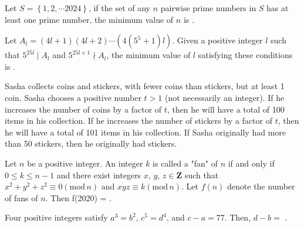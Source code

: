 \begin{problem}\label{Alg1}
Let $S=\left\{ 1,2,\cdots 2024 \right\}$, if the set of any $n$ pairwise prime numbers in $S$ has at least one prime number, the minimum value of $n$ is \underline{\hspace{2cm}}.
\end{problem}



\begin{problem}\label{Alg2}
Let $A_l = (4l+1)(4l+2) \cdots \left(4(5^5+1)l\right)$. Given a positive integer $l$ such that $5^{25l} \mid A_l$ and $5^{25l+1} \nmid A_l$, the minimum value of $l$ satisfying these conditions is \underline{\hspace{2cm}}.

\end{problem}	


\begin{problem}\label{Alg3}
Sasha collects coins and stickers, with fewer coins than stickers, but at least 1 coin. Sasha chooses a positive number $t > 1$ (not necessarily an integer). If he increases the number of coins by a factor of $t$, then he will have a total of 100 items in his collection. If he increases the number of stickers by a factor of $t$, then he will have a total of 101 items in his collection. If Sasha originally had more than 50 stickers, then he originally had \underline{\hspace{2cm}} stickers.
\end{problem}



\begin{problem}\label{Alg4}
Let $n$ be a positive integer. An integer $k$ is called a "fan" of $n$ if and only if $0 \leqslant k \leqslant n-1$ and there exist integers $x$, $y$, $z \in \mathbf{Z}$ such that $x^2+y^2+z^2 \equiv 0 (\mathrm{mod} \, n)$ and $xyz \equiv k (\mathrm{mod} \, n)$. Let $f(n)$ denote the number of fans of $n$. Then f(2020) = \underline{\hspace{2cm}}.
\end{problem}


\begin{problem}\label{Alg5}
	
Four positive integers satisfy $a^3=b^2$, $c^5=d^4$, and $c-a=77$. Then, $d-b=$ 
	\underline{\hspace{2cm}}.
	
\end{problem}



